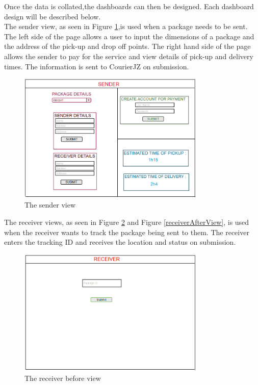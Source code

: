 \documentclass[paper=a4, fontsize=11pt]{scrartcl} %
\numberwithin{equation}{section} %
\numberwithin{figure}{section} %
\numberwithin{table}{section} %
\begin{document}
Once the data is collated,the dashboards can then be designed. Each dashboard design will be described below.
\\


The sender view, as seen in Figure \ref{SenderView},is used when a package needs to be sent. The left side of the page allows a user to input the dimensions of a package and the address of the pick-up and drop off points. The right hand side of the page allows the sender to pay for the service and view details of pick-up and delivery times. The information is sent to CourierJZ on submission.
\\

\begin{figure}[hbt!]
\centering
\includegraphics[width=3.5in]{pictures/sender.png}
\caption{The sender view}
\label{SenderView}
\end{figure}


The receiver views, as seen in Figure \ref{receiverBeforeView} and Figure \ref{receiverAfterView}, is used when the receiver wants to track the package being sent to them. The receiver enters the tracking ID and receives the location and status on submission.
\\

\begin{figure}[hbt!]
\centering
\includegraphics[width=3.5in]{pictures/receiverBefore.png}
\caption{The receiver before view}
\label{receiverBeforeView}
\end{figure}
\end{document}
